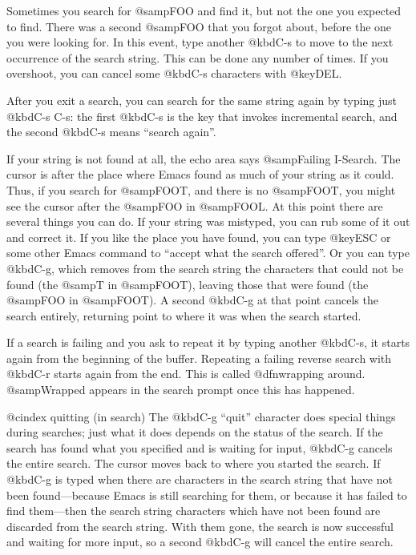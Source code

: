 {{{{{{{{  Sometimes you search for @samp{FOO} and find it, but not the one you
expected to find.  There was a second @samp{FOO} that you forgot about,
before the one you were looking for.  In this event, type another @kbd{C-s}
to move to the next occurrence of the search string.  This can be done any
number of times.  If you overshoot, you can cancel some @kbd{C-s}
characters with @key{DEL}.

  After you exit a search, you can search for the same string again by
typing just @kbd{C-s C-s}: the first @kbd{C-s} is the key that invokes
incremental search, and the second @kbd{C-s} means ``search again''.

  If your string is not found at all, the echo area says @samp{Failing
I-Search}.  The cursor is after the place where Emacs found as much of your
string as it could.  Thus, if you search for @samp{FOOT}, and there is no
@samp{FOOT}, you might see the cursor after the @samp{FOO} in @samp{FOOL}.
At this point there are several things you can do.  If your string was
mistyped, you can rub some of it out and correct it.  If you like the place
you have found, you can type @key{ESC} or some other Emacs command to
``accept what the search offered''.  Or you can type @kbd{C-g}, which
removes from the search string the characters that could not be found (the
@samp{T} in @samp{FOOT}), leaving those that were found (the @samp{FOO} in
@samp{FOOT}).  A second @kbd{C-g} at that point cancels the search
entirely, returning point to where it was when the search started.

  If a search is failing and you ask to repeat it by typing another
@kbd{C-s}, it starts again from the beginning of the buffer.  Repeating
a failing reverse search with @kbd{C-r} starts again from the end.  This
is called @dfn{wrapping around}.  @samp{Wrapped} appears in the search
prompt once this has happened.

@cindex quitting (in search)
  The @kbd{C-g} ``quit'' character does special things during searches;
just what it does depends on the status of the search.  If the search has
found what you specified and is waiting for input, @kbd{C-g} cancels the
entire search.  The cursor moves back to where you started the search.  If
@kbd{C-g} is typed when there are characters in the search string that have
not been found---because Emacs is still searching for them, or because it
has failed to find them---then the search string characters which have not
been found are discarded from the search string.  With them gone, the
search is now successful and waiting for more input, so a second @kbd{C-g}
will cancel the entire search.

}}}}}}}}
